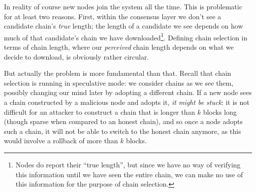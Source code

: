 In reality of course new nodes join the system all the time. This is problematic
for at least two reasons. First, within the consensus layer we don't see a
candidate chain's \emph{true} length; the length of a candidate we see depends
on how much of that candidate's chain we have downloaded\footnote{Nodes do
report their ``true length'', but since we have no way of verifying this
information until we have seen the entire chain, we can make no use of this
information for the purpose of chain selection.}. Defining chain
selection in terms of chain length, where our \emph{perceived} chain length
depends on what we decide to download, is obviously rather circular.

But actually the problem is more fundamental than that. Recall that chain
selection is running in speculative mode: we consider chains as we see them,
possibly changing our mind later by adopting a different chain. If a new node
sees a chain constructed by a malicious node and adopts it, \emph{it might be
stuck}: it is not difficult for an attacker to construct a chain that is longer
than $k$ blocks long (though sparse when compared to an honest chain), and so once a node adopts such a chain, it will not be
able to switch to the honest chain anymore, as this would involve a rollback
of more than $k$ blocks.


